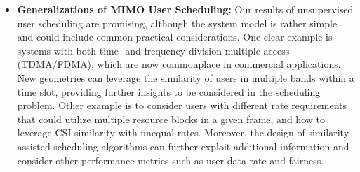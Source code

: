 \begin{itemize}
	\item \textbf{Generalizations of MIMO User Scheduling:} 
	Our results of unsupervised user scheduling are promising, although the system model is rather simple and could include common practical considerations. One clear example is systems with both time- and frequency-division multiple access (TDMA/FDMA), which are now commonplace in commercial applications. New geometries can leverage the similarity of users in multiple bands within a time slot, providing further insights to be considered in the scheduling problem. Other example is to consider users with different rate requirements that could utilize multiple resource blocks in a given frame, and how to leverage CSI similarity with unequal rates. Moreover, the design of similarity-assisted scheduling algorithms can further exploit additional information and consider other performance metrics such as user data rate and fairness.
\end{itemize}
